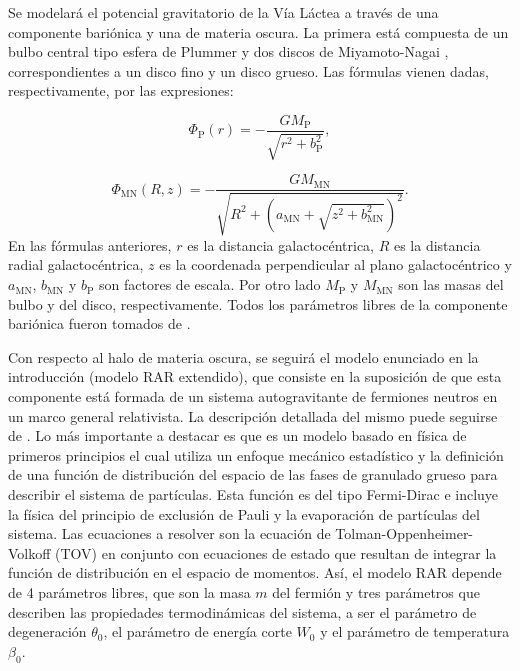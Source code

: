 \documentclass[baaa]{baaa}
\begin{document}
Se modelará el potencial gravitatorio de la Vía Láctea a través de una componente bariónica y una de materia oscura. La primera está compuesta de un bulbo central tipo esfera de Plummer y dos discos de Miyamoto-Nagai \citep{Miyamoto1975},  correspondientes a un disco fino y un disco grueso. Las fórmulas vienen dadas, respectivamente, por las expresiones:

\begin{equation}
    \Phi_{\mathrm{P}}(r) = - \frac{GM_{\mathrm{P}}}{\sqrt{r^{2} + b_{\mathrm{P}}^{2}}},
\end{equation}

\begin{equation}
    \Phi_{\mathrm{MN}}(R,z) = - \frac{GM_{\mathrm{MN}}}{\sqrt{R^{2} + \left(a_{\mathrm{MN}} + \sqrt{z^{2} + b_{\mathrm{MN}}^{2}}\right)^{2}}}.
\end{equation}
En las fórmulas anteriores, $r$ es la distancia galactocéntrica, $R$ es la distancia radial galactocéntrica, $z$ es la coordenada perpendicular al plano galactocéntrico y $a_{\mathrm{MN}}$, $b_{\mathrm{MN}}$ y $b_{\mathrm{P}}$ son factores de escala. Por otro lado $M_{\mathrm{P}}$ y $M_{\mathrm{MN}}$ son las masas del bulbo y del disco, respectivamente. Todos los parámetros libres de la componente bariónica fueron tomados de \cite{Pouliasis2017}.

Con respecto al halo de materia oscura, se seguirá el modelo enunciado en la introducción (modelo RAR extendido), que consiste en la suposición de que esta componente está formada de un sistema autogravitante de fermiones neutros en un marco general relativista. La descripción detallada del mismo puede seguirse de \cite{Arguelles2018}. Lo más importante a destacar es que es un modelo basado en física de primeros principios el cual utiliza un enfoque mecánico estadístico y la definición de una función de distribución del espacio de las fases de granulado grueso para describir el sistema de partículas. Esta función es del tipo Fermi-Dirac e incluye la física del principio de exclusión de Pauli y la evaporación de partículas del sistema. Las ecuaciones a resolver son la ecuación de Tolman-Oppenheimer-Volkoff (TOV) en conjunto con ecuaciones de estado que resultan de integrar la función de distribución en el espacio de momentos. Así, el modelo RAR depende de 4 parámetros libres, que son la masa $m$ del fermión y tres parámetros que describen las propiedades termodinámicas del sistema, a ser el parámetro de degeneración $\theta_{0}$, el parámetro de energía corte $W_{0}$ y el parámetro de temperatura $\beta_{0}$.
\end{document}
